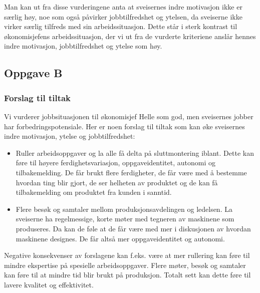 Man kan ut fra disse vurderingene anta at sveisernes indre motivasjon ikke er særlig høy, noe som også påvirker jobbtilfredshet og ytelsen, da sveiserne ikke virker særlig tilfreds med sin arbeidssituasjon.
Dette står i sterk kontrast til økonomisjefens arbeidssituasjon, der vi ut fra de vurderte kriteriene anslår hennes indre motivasjon, jobbtilfredshet og ytelse som høy.

\subsection{Oppgave B}
\subsubsection{Forslag til tiltak}
Vi vurderer jobbsituasjonen til økonomisjef Helle som god, men sveisernes jobber har forbedringspotensiale. Her er noen forslag til tiltak som kan øke sveisernes indre motivasjon, ytelse og jobbtilfredshet:

\begin{itemize}
  \item Ruller arbeidsoppgaver og la alle få delta på sluttmontering iblant. Dette kan føre til høyere ferdighetsvariasjon, oppgaveidentitet, autonomi og tilbakemelding. De får brukt flere ferdigheter, de får være med å bestemme hvordan ting blir gjort, de ser helheten av produktet og de kan få tilbakemelding om produktet fra kunden i sanntid.
  \item Flere besøk og samtaler mellom produksjonsavdelingen og ledelsen. La sveiserne ha regelmessige, korte møter med tegneren av maskinene som produseres. Da kan de føle at de får være med mer i diskusjonen av hvordan maskinene designes. De får altså mer oppgaveidentitet og autonomi.
\end{itemize}

Negative konsekvenser av forslagene kan f.eks. være at mer rullering kan føre til mindre ekspertise på spesielle arbeidsoppgaver. Flere møter, besøk og samtaler kan føre til at mindre tid blir brukt på produksjon. Totalt sett kan dette føre til lavere kvalitet og effektivitet.

